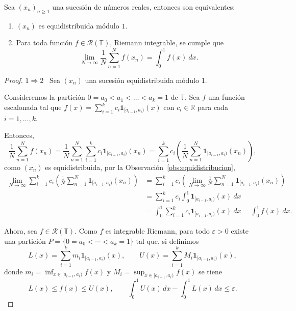 \begin{theorem}
    \label{carac:riemann}
    Sea $(x_n)_{n\geq1}$ una sucesión de números reales, entonces son equivalentes:
    \begin{enumerate}
        \item $(x_n)$ es equidistribuida módulo $1$.
        \item Para toda función $f\in \mathcal{R}(\mathbb{T})$, Riemann integrable, se cumple que
              \[
                  \lim_{N \to \infty} \frac{1}{N} \sum_{n=1}^N f(x_n) = \int_0^1 f(x)\ dx.
              \]
    \end{enumerate}
\end{theorem}

\begin{proof}
    $1 \Longrightarrow 2$ \, Sea $(x_n)$ una sucesión equidistribuida módulo 1.
    
    Consideremos la partición $0=a_0 < a_1 < \ldots < a_k=1$ de $\mathbb{T}$. Sea $f$ una función 
    escalonada tal que $f(x) = \sum_{i=1}^k c_i \mathbf{1}_{[a_{i-1}, a_i)}(x)$ con $c_i \in \mathbb{R}$
    para cada $i=1,\ldots,k$.

    Entonces,
    \[
        \frac{1}{N} \sum_{n=1}^N f(x_n) = 
        \frac{1}{N} \sum_{n=1}^N \sum_{i=1}^k c_i \mathbf{1}_{[a_{i-1}, a_i)}(x_n) = 
        \sum_{i=1}^k c_i \left(\frac{1}{N} \sum_{n=1}^N \mathbf{1}_{[a_{i-1}, a_i)}(x_n)\right),
    \]
    como $(x_n)$ es equidistribuida, por la Observación~\ref{obs:equidistribucion}, 
    \begin{align*}
        \lim_{N \to \infty} \sum_{i=1}^k c_i \left(\frac{1}{N} \sum_{n=1}^N \mathbf{1}_{[a_{i-1}, a_i)}(x_n)\right)
        &= \sum_{i=1}^k c_i \left(\lim_{N \to \infty} \frac{1}{N} \sum_{n=1}^N \mathbf{1}_{[a_{i-1}, a_i)}(x_n)\right) \\
        &= \sum_{i=1}^k c_i \int_0^1 \mathbf{1}_{[a_{i-1}, a_i)}(x)\ dx \\
        &= \int_0^1 \sum_{i=1}^k c_i \mathbf{1}_{[a_{i-1}, a_i)}(x)\ dx 
        =\int_0^1 f(x)\ dx.
    \end{align*}
    
    Ahora, sea $f \in \mathcal{R}(\mathbb{T})$. Como $f$ es integrable Riemann, 
    para todo $\varepsilon > 0$ existe una partición $P=\{0=a_0<\cdots<a_k=1\}$ tal que, 
    si definimos
    \[
        L(x)=\sum_{i=1}^k m_i \mathbf{1}_{[a_{i-1},a_i)}(x), \qquad
        U(x)=\sum_{i=1}^k M_i \mathbf{1}_{[a_{i-1},a_i)}(x),
    \]
    donde $m_i=\inf_{x\in[a_{i-1},a_i)} f(x)$ y $M_i=\sup_{x\in[a_{i-1},a_i)} f(x)$
    se tiene
    \[
        L(x)\le f(x)\le U(x), \qquad \int_0^1 U(x) \, dx - \int_0^1 L(x) \, dx \leq \varepsilon.
    \]


\end{proof}
